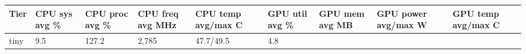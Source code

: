 \documentclass[
  9pt, a4paper, landscape]{article}
\begin{document}
\begin{longtable}[]{@{}lllllllll@{}}
\toprule
\begin{minipage}[b]{0.08\columnwidth}\raggedright
Tier\strut
\end{minipage} & \begin{minipage}[b]{0.08\columnwidth}\raggedright
CPU sys avg \%\strut
\end{minipage} & \begin{minipage}[b]{0.08\columnwidth}\raggedright
CPU proc avg \%\strut
\end{minipage} & \begin{minipage}[b]{0.08\columnwidth}\raggedright
CPU freq avg MHz\strut
\end{minipage} & \begin{minipage}[b]{0.08\columnwidth}\raggedright
CPU temp avg/max C\strut
\end{minipage} & \begin{minipage}[b]{0.08\columnwidth}\raggedright
GPU util avg \%\strut
\end{minipage} & \begin{minipage}[b]{0.08\columnwidth}\raggedright
GPU mem avg MB\strut
\end{minipage} & \begin{minipage}[b]{0.08\columnwidth}\raggedright
GPU power avg/max W\strut
\end{minipage} & \begin{minipage}[b]{0.08\columnwidth}\raggedright
GPU temp avg/max C\strut
\end{minipage}\tabularnewline
\midrule
\endhead
\begin{minipage}[t]{0.08\columnwidth}\raggedright
tiny\strut
\end{minipage} & \begin{minipage}[t]{0.08\columnwidth}\raggedright
9.5\strut
\end{minipage} & \begin{minipage}[t]{0.08\columnwidth}\raggedright
127.2\strut
\end{minipage} & \begin{minipage}[t]{0.08\columnwidth}\raggedright
2,785\strut
\end{minipage} & \begin{minipage}[t]{0.08\columnwidth}\raggedright
47.7/49.5\strut
\end{minipage} & \begin{minipage}[t]{0.08\columnwidth}\raggedright
4.8\strut
\end{minipage} & \begin{minipage}[t]{0.08\columnwidth}\raggedright

\end{minipage}
\end{longtable}
\end{document}
